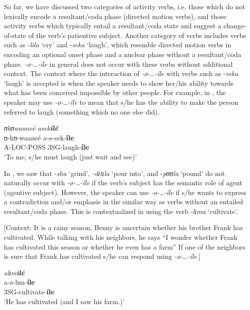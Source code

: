 \documentclass[output=paper,newtxmath,modfonts,nonflat,draftmode]{langsci/langscibook}
\begin{document}
So far, we have discussed two categories of activity verbs, i.e. those which do not lexically encode a resultant/coda phase (directed motion verbs), and those activity verbs which typically entail a resultant/coda state and suggest a change-of-state of the verb’s patientive subject. Another category of verbs includes verbs such as -\textit{lila} ‘cry’ and -\textit{seka} ‘laugh’, which resemble directed motion verbs in encoding an optional onset phase and a nuclear phase without a resultant/coda phase. \textit{-ø}\textit{-…-íle} in general does not occur with these verbs without additional context. The context where the interaction of \textit{-ø}\textit{-…-íle} with verbs such as -\textit{seka} ‘laugh’ is accepted is when the speaker needs to show her/his ability towards what has been conceived impossible by other people. For example, in , the speaker may use \textit{-ø}\textit{-…-íle} to mean that s/he has the ability to make the person referred to laugh (something which no one else did). 

\ea \label{ex:kanijo:29}
\ea
\glll \textit{ʊk}\textit{ʊwaaneé}    \textit{asek}\textbf{\textit{ílé}}\\
  ʊ-kʊ-waaneé a-ø-sek-\textbf{íle}\\
   A-LOC-POSS  3SG-laugh-\textbf{íle}\\
  \glt ‘To me, s/he must laugh (just wait and see)’
\z
\z

In , we saw that -\textit{sha} ‘grind’, \textit{-dɪ}\textit{tɪ}\textit{la} ‘pour into’, and -\textit{pʊʊ}\textit{la} ‘pound’ do not naturally occur with \textit{-ø}\textit{-…-íle} if the verb’s subject has the semantic role of agent (agentive subject). However, the speaker can use \textit{-ø}\textit{-…-íle} if s/he wants to express a contradiction and/or emphasis in the similar way as verbs without an entailed resultant/coda phase. This is contextualized in  using the verb -\textit{lɪ}\textit{ma} ‘cultivate’. 

\ea \label{ex:kanijo:30}
\ea{} 
[Context: It is a rainy season, Benny is uncertain whether his brother Frank has cultivated. While talking with his neighbors, he says “I wonder whether Frank has cultivated this season or whether he even has a farm” If one of the neighbors is sure that Frank has cultivated s/he can respond using \textit{-ø}\textit{-…-íle}.]

\glll \textit{alɪ}\textit{m}\textbf{\textit{ilé}}\\
a-ø-lɪm-\textbf{íle}\\
3SG-cultivate-\textbf{íle}\\
\glt ‘He has cultivated (and I saw his farm.)’
\z
\z
\end{document}
